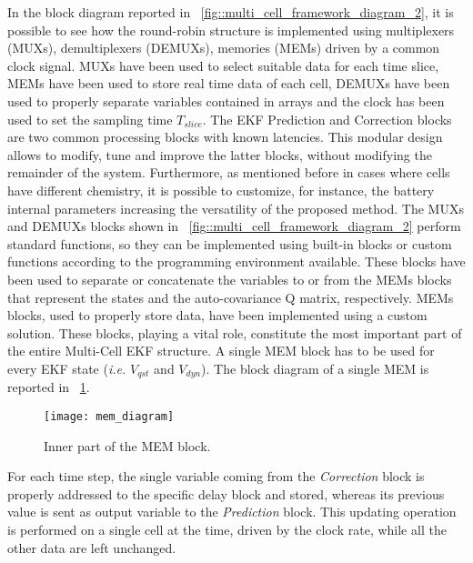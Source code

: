 \documentclass[journal]{IEEEtran}
\begin{document}
In the block diagram reported in \figurename~\ref{fig::multi_cell_framework_diagram_2}, it is possible to see how the round-robin structure is implemented using multiplexers (MUXs), demultiplexers (DEMUXs), memories (MEMs) driven by a common clock signal. 
MUXs have been used to select suitable data for each time slice, MEMs have been used to store real time data of each cell, DEMUXs have been used to properly separate variables contained in arrays and the clock has been used to set the sampling time $T_{slice}$.
The EKF Prediction and Correction blocks are two common processing blocks with known latencies. This modular design allows to modify, tune and improve the latter blocks, without modifying the remainder of the system.  
Furthermore, as mentioned before in cases where cells have different chemistry, it is possible to customize, for instance, the battery internal parameters increasing the versatility of the proposed method.
The MUXs and DEMUXs blocks shown in \figurename~\ref{fig::multi_cell_framework_diagram_2} perform standard functions, so they can be implemented using built-in blocks or custom functions according to the programming environment available. 
These blocks have been used to separate or concatenate the variables to or from the MEMs blocks that represent the states and the auto-covariance Q matrix, respectively.
MEMs blocks, used to properly store data, have been implemented using a custom solution.
These blocks, playing a vital role, constitute the most important part of the entire Multi-Cell EKF structure.
A single MEM block has to be used for every EKF state (\textit{i.e.} $V_{qst}$ and $V_{dyn}$).
The block diagram of a single MEM is reported in \figurename~\ref{fig::mem_diagram}.
\begin{figure}[!htbp]
	\centering
		\texttt{[image: mem\_diagram]}
	\caption{Inner part of the MEM block.}
	\label{fig::mem_diagram}
\end{figure}
For each time step, the single variable coming from the \textit{Correction} block is properly addressed to the specific delay block and stored, whereas its previous value is sent as output variable to the \textit{Prediction} block.
This updating operation is performed on a single cell at the time, driven by the clock rate, while all the other data are left unchanged.
\end{document}
